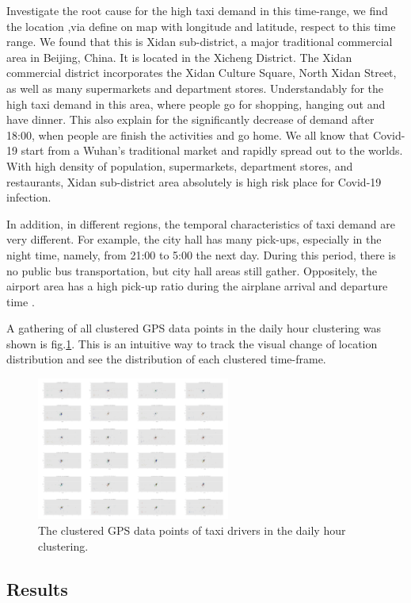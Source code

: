 \documentclass[journal]{IEEEtran}
\begin{document}
Investigate the root cause for the high taxi demand in this time-range, we find the location ,via define on map with longitude and latitude, respect to this time range. We found that this is Xidan sub-district, a major traditional commercial area in Beijing, China. It is located in the Xicheng District. The Xidan commercial district incorporates the Xidan Culture Square, North Xidan Street, as well as many supermarkets and department stores. Understandably for the high taxi demand in this area, where people go for shopping, hanging out and have dinner. This also explain for the significantly decrease of demand after 18:00, when people are finish the activities and go home. We all know that Covid-19 start from a Wuhan's traditional market and rapidly spread out to the worlds. With high density of population, supermarkets, department stores, and restaurants, Xidan sub-district area absolutely is high risk place for Covid-19 infection. 

In addition, in different regions, the temporal characteristics of taxi demand are very different. For example, the city hall has many pick-ups, especially in the night time, namely, from 21:00 to 5:00 the next day. During this period, there is no public bus transportation, but city hall areas still gather. Oppositely, the airport area has a high pick-up ratio during the airplane arrival and departure time \cite{santani2008spatio}\cite{agarwal2004comparison}.

A gathering of all clustered GPS data points in the daily hour clustering was shown is fig.\ref{fig_ScatterResize}. This is an intuitive way to track the visual change of location distribution and see the distribution of each clustered time-frame.

\begin{figure}[!t]
	\centering
	\includegraphics[width=2.5in]{image/ScatterResize.png}
	\caption{The clustered GPS data points of taxi drivers in the daily hour clustering.}
	\label{fig_ScatterResize}
\end{figure}

\subsection{Results}
\end{document}
